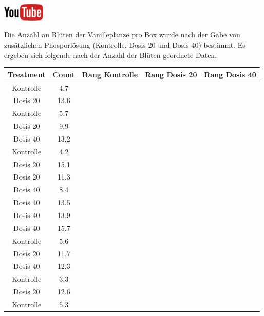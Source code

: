 \documentclass[a4paper, 9pt]{scrartcl}\usepackage[]{graphicx}\usepackage[]{xcolor}
\newenvironment{knitrout}{}{} %
\begin{document}
\hfill\href{https://youtu.be/gC0SXiIG2wQ}{\includegraphics[width =
  2cm]{img/youtube}} %
\hspace{2Ex}




Die Anzahl an Bl{\"u}ten der Vanilleplanze pro Box wurde nach der Gabe von
zus{\"a}tzlichen Phosporl{\"o}sung (Kontrolle, Dosis 20 und Dosis 40) bestimmt. Es
ergeben sich folgende nach der Anzahl der Bl{\"u}ten geordnete Daten.

\begin{knitrout}
\color{fgcolor}\begin{table}[!h]
\centering
\begin{tabular}{ccccc}
\toprule
Treatment & Count & Rang Kontrolle & Rang Dosis 20 & Rang Dosis 40\\
\midrule
Kontrolle & 4.7 &  &  & \\
Dosis 20 & 13.6 &  &  & \\
Kontrolle & 5.7 &  &  & \\
Dosis 20 & 9.9 &  &  & \\
Dosis 40 & 13.2 &  &  & \\
\addlinespace
Kontrolle & 4.2 &  &  & \\
Dosis 20 & 15.1 &  &  & \\
Dosis 20 & 11.3 &  &  & \\
Dosis 40 & 8.4 &  &  & \\
Dosis 40 & 13.5 &  &  & \\
\addlinespace
Dosis 40 & 13.9 &  &  & \\
Dosis 40 & 15.7 &  &  & \\
Kontrolle & 5.6 &  &  & \\
Dosis 20 & 11.7 &  &  & \\
Dosis 40 & 12.3 &  &  & \\
\addlinespace
Kontrolle & 3.3 &  &  & \\
Dosis 20 & 12.6 &  &  & \\
Kontrolle & 5.3 &  &  & \\
\bottomrule
\end{tabular}
\end{table}

\end{knitrout}
\end{document}
